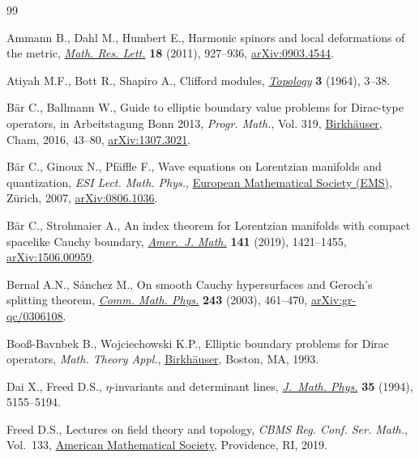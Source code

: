 \begin{thebibliography}{99}
\footnotesize\itemsep=0pt

Ammann B., Dahl M., Humbert E., Harmonic spinors and local deformations of the
 metric, \href{https://doi.org/10.4310/MRL.2011.v18.n5.a10}{\textit{Math. Res. Lett.}} \textbf{18} (2011), 927--936,
 \href{https://arxiv.org/abs/0903.4544}{arXiv:0903.4544}.

Atiyah M.F., Bott R., Shapiro A., Clifford modules, \href{https://doi.org/10.1016/0040-9383(64)90003-5}{\textit{Topology}}
 \textbf{3} (1964), 3--38.

B\"ar C., Ballmann W., Guide to elliptic boundary value problems for
 {D}irac-type operators, in Arbeitstagung {B}onn 2013, \textit{Progr. Math.},
 Vol. 319, \href{https://doi.org/10.1007/978-3-319-43648-7_3}{Birkh\"auser}, Cham, 2016, 43--80, \href{https://arxiv.org/abs/1307.3021}{arXiv:1307.3021}.

B\"ar C., Ginoux N., Pf\"affle F., Wave equations on {L}orentzian manifolds and
 quantization, \textit{ESI Lect. Math. Phys.}, \href{https://doi.org/10.4171/037}{European Mathematical Society (EMS)},
 Z\"urich, 2007, \href{https://arxiv.org/abs/0806.1036}{arXiv:0806.1036}.

B\"ar C., Strohmaier A., An index theorem for {L}orentzian manifolds with
 compact spacelike {C}auchy boundary, \href{https://doi.org/10.1353/ajm.2019.0037}{\textit{Amer.~J. Math.}} \textbf{141}
 (2019), 1421--1455, \href{https://arxiv.org/abs/1506.00959}{arXiv:1506.00959}.

Bernal A.N., S\'anchez M., On smooth {C}auchy hypersurfaces and {G}eroch's
 splitting theorem, \href{https://doi.org/10.1007/s00220-003-0982-6}{\textit{Comm. Math. Phys.}} \textbf{243} (2003), 461--470,
 \href{https://arxiv.org/abs/gr-qc/0306108}{arXiv:gr-qc/0306108}.

Boo{\ss}-Bavnbek B., Wojciechowski K.P., Elliptic boundary problems for {D}irac
 operators, \textit{Math. Theory Appl.}, \href{https://doi.org/10.1007/978-1-4612-0337-7}{Birkh\"auser}, Boston, MA, 1993.

Dai X., Freed D.S., {$\eta$}-invariants and determinant lines, \href{https://doi.org/10.1063/1.530747}{\textit{J.~Math. Phys.}} \textbf{35} (1994),
 5155--5194.

Freed D.S., Lectures on field theory and topology, \textit{CBMS Reg. Conf. Ser.
 Math.}, Vol.~133, \href{https://doi.org/10.1090/cbms/133}{American Mathematical Society}, Providence, RI, 2019.


\end{thebibliography}
